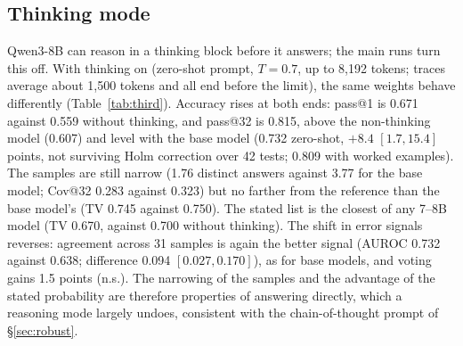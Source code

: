 \documentclass[11pt]{article}
\begin{document}
\subsection{Thinking mode}\label{sec:thinking}
Qwen3-8B can reason in a thinking block before it answers; the main runs turn this off. With thinking on (zero-shot prompt, $T{=}0.7$, up to 8,192 tokens; traces average about 1,500 tokens and all end before the limit), the same weights behave differently (Table~\ref{tab:third}). Accuracy rises at both ends: pass@1 is 0.671 against 0.559 without thinking, and pass@32 is 0.815, above the non-thinking model (0.607) and level with the base model (0.732 zero-shot, $+8.4$ $[1.7,15.4]$ points, not surviving Holm correction over 42 tests; 0.809 with worked examples). The samples are still narrow (1.76 distinct answers against 3.77 for the base model; Cov@32 0.283 against 0.323) but no farther from the reference than the base model's (TV 0.745 against 0.750). The stated list is the closest of any 7--8B model (TV 0.670, against 0.700 without thinking). The shift in error signals reverses: agreement across 31 samples is again the better signal (AUROC 0.732 against 0.638; difference 0.094 $[0.027,0.170]$), as for base models, and voting gains 1.5 points (n.s.). The narrowing of the samples and the advantage of the stated probability are therefore properties of answering directly, which a reasoning mode largely undoes, consistent with the chain-of-thought prompt of \S\ref{sec:robust}.
\end{document}
